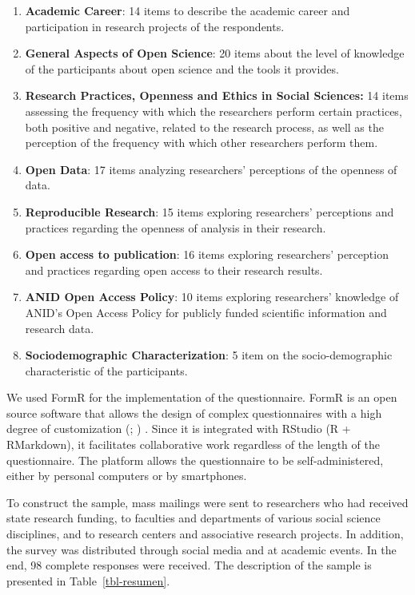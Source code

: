 \documentclass[
  english,
  letterpaper,
]{article}
\providecommand{\tightlist}{%
  \setlength{\itemsep}{0pt}\setlength{\parskip}{0pt}}
\begin{document}
\begin{enumerate}
\def\labelenumi{\arabic{enumi}.}
\tightlist
\item
  \textbf{Academic Career}: 14 items to describe the academic career and
  participation in research projects of the respondents.
\item
  \textbf{General Aspects of Open Science}: 20 items about the level of
  knowledge of the participants about open science and the tools it
  provides.
\item
  \textbf{Research Practices, Openness and Ethics in Social Sciences:}
  14 items assessing the frequency with which the researchers perform
  certain practices, both positive and negative, related to the research
  process, as well as the perception of the frequency with which other
  researchers perform them.
\item
  \textbf{Open Data}: 17 items analyzing researchers' perceptions of the
  openness of data.
\item
  \textbf{Reproducible Research}: 15 items exploring researchers'
  perceptions and practices regarding the openness of analysis in their
  research.
\item
  \textbf{Open access to publication}: 16 items exploring researchers'
  perception and practices regarding open access to their research
  results.
\item
  \textbf{ANID Open Access Policy}: 10 items exploring researchers'
  knowledge of ANID's Open Access Policy for publicly funded scientific
  information and research data.
\item
  \textbf{Sociodemographic Characterization}: 5 item on the
  socio-demographic characteristic of the participants.
\end{enumerate}

We used FormR for the implementation of the questionnaire. FormR is an
open source software that allows the design of complex questionnaires
with a high degree of customization
(;
) .
Since it is integrated with RStudio (R + RMarkdown), it facilitates
collaborative work regardless of the length of the questionnaire. The
platform allows the questionnaire to be self-administered, either by
personal computers or by smartphones.

To construct the sample, mass mailings were sent to researchers who had
received state research funding, to faculties and departments of various
social science disciplines, and to research centers and associative
research projects. In addition, the survey was distributed through
social media and at academic events. In the end, 98 complete responses
were received. The description of the sample is presented in
Table~\ref{tbl-resumen}.
\end{document}
